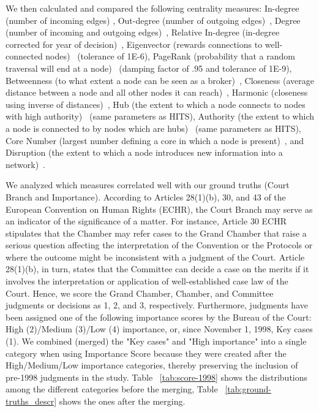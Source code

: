 \documentclass[sigconf,authordraft]{acmart}
\begin{document}
We then calculated and compared the following centrality measures: In-degree (number of incoming edges) \cite{Derlen_etal_2014}, Out-degree (number of outgoing edges)~\cite{Derlen_etal_2014}, Degree (number of incoming and outgoing edges)~\cite{Derlen_etal_2014}, Relative In-degree (in-degree corrected for year of decision)~\cite{Tarissan_etal_2016}, Eigenvector (rewards connections to well-connected nodes)~\cite{Newman2018} (tolerance of 1E-6), PageRank (probability that a random traversal will end at a node)~\cite{Page_etal_1999} (damping factor of .95 and tolerance of 1E-9), Betweenness (to what extent a node can be seen as a broker)~\cite{Freeman1977}, Closeness (average distance between a node and all other nodes it can reach)~\cite{Freeman1979}, Harmonic (closeness using inverse of distances)~\cite{Paolo_etal_2014}, Hub (the extent to which a node connects to nodes with high authority)~\cite{Kleinberg1999} (same parameters as HITS), Authority (the extent to which a node is connected to by nodes which are hubs)~\cite{Kleinberg1999} (same parameters as HITS), Core Number (largest number defining a core in which a node is present)~\cite{Batagelj_etal_2011}, and Disruption (the extent to which a node introduces new information into a network)~\cite{Wu_etal_2019}.


We analyzed which measures correlated well with our ground truths (Court Branch and Importance). According to Articles 28(1)(b), 30, and 43 of the European Convention on Human Rights (ECHR), the Court Branch may serve as an indicator of the significance of a matter. For instance, Article 30 ECHR stipulates that the Chamber may refer cases to the Grand Chamber that raise a serious question affecting the interpretation of the Convention or the Protocols or where the outcome might be inconsistent with a judgment of the Court. Article 28(1)(b), in turn, states that the Committee can decide a case on the merits if it involves the interpretation or application of well-established case law of the Court. Hence, we score the Grand Chamber, Chamber, and Committee judgments or decisions as 1, 2, and 3, respectively.
Furthermore, judgments have been assigned one of the following importance scores by the Bureau of the Court: High (2)/Medium (3)/Low (4) importance, or, since November 1, 1998, Key cases (1). We combined (merged) the "Key cases" and "High importance" into a single category when using Importance Score because they were created after the High/Medium/Low importance categories, thereby preserving the inclusion of pre-1998 judgments in the study.
Table ~\ref{tab:score-1998} shows the distributions among the different categories before the merging, Table ~\ref{tab:ground-truths_descr} shows the ones after the merging.
\end{document}
